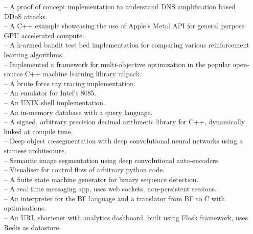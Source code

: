 \documentclass[mm]{simple_style}
\begin{document}
\begin{resume}
\href{https://github.com/say4n/dns.amplify}{} -- A proof of concept implementation to understand DNS amplification based DDoS attacks.\\
\href{https://github.com/say4n/metal.compute}{} -- A C++ example showcasing the use of Apple's Metal API for general purpose GPU accelerated compute.\\
\href{https://github.com/say4n/bandit.rl}{} -- A k-armed bandit test bed implementation for comparing various reinforcement learning algorithms.\\
\href{https://github.com/mlpack/ensmallen}{} -- Implemented a framework for multi-objective optimization in the popular open-source C++ machine learning library mlpack.\\
\href{https://github.com/say4n/rtx.go}{} -- A brute force ray tracing implementation.\\
\href{https://github.com/say4n/eightyfive}{} -- An emulator for Intel’s 8085.\\
\href{https://github.com/say4n/ysh}{} -- An UNIX shell implementation.\\
\href{https://github.com/say4n/gobi}{} -- An in-memory database with a query language.\\
\href{https://github.com/say4n/infinity}{} -- A signed, arbitrary precision decimal arithmetic library for C++, dynamically linked at compile time.\\
\href{https://github.com/say4n/deepcosegmentation.pytorch}{} – Deep object co-segmentation with deep convolutional neural networks using a siamese architecture.\\
\href{https://github.com/say4n/pytorch-segnet}{} -- Semantic image segmentation using deep convolutional auto-encoders.\\
\href{https://github.com/say4n/flow}{} -- Visualiser for control flow of arbitrary python code.\\
\href{https://github.com/say4n/fsmutil}{} -- A finite state machine generator for binary sequence detection.\\
\href{https://github.com/say4n/pyscuss}{} – A real time messaging app, uses web sockets, non-persistent sessions.\\
\href{https://github.com/say4n/bfutil}{} -- An interpreter for the BF language and a translator from BF to C with optimisations.\\
\href{https://github.com/say4n/LinkTo}{} -- An URL shortener with analytics dashboard, built using Flask framework, uses Redis as datastore.


\end{resume}
\end{document}
